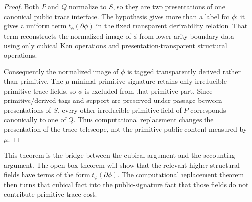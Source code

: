\begin{proof}
Both \(P\) and \(Q\) normalize to \(S\), so they are two presentations of one canonical public
trace interface.  The hypothesis gives more than a label for \(\phi\): it gives a uniform term
\(t_\phi(\partial\phi)\) in the fixed transparent derivability relation.  That term reconstructs
the normalized image of \(\phi\) from lower-arity boundary data using only cubical Kan
operations and presentation-transparent structural operations.

Consequently the normalized image of \(\phi\) is tagged transparently derived rather than
primitive.  The \(\mu\)-minimal primitive signature retains only irreducible primitive trace
fields, so \(\phi\) is excluded from that primitive part.  Since primitive/derived tags and
support are preserved under passage between presentations of \(S\), every other irreducible
primitive field of \(P\) corresponds canonically to one of \(Q\).  Thus computational
replacement changes the presentation of the trace telescope, not the primitive public content
measured by \(\mu\).
\end{proof}

This theorem is the bridge between the cubical argument and the accounting argument.  The
open-box theorem will show that the relevant higher structural fields have terms of the form
\(t_\phi(\partial\phi)\).  The computational replacement theorem then turns that cubical fact
into the public-signature fact that those fields do not contribute primitive trace cost.

